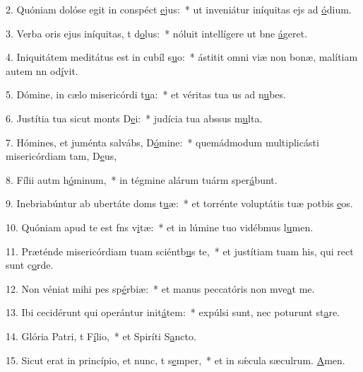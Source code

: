 2. Quóniam dolóse egit in conspéct \uline{e}jus:~* ut inveniátur iníquitas ejs ad \uline{ó}dium.\par 
3. Verba oris ejus iníquitas, t d\uline{o}lus:~* nóluit intellígere ut bne \uline{á}geret.\par 
4. Iniquitátem meditátus est in cubíl s\uline{u}o:~* ástitit omni viæ non bonæ, malítiam autem nn od\uline{í}vit.\par 
5. Dómine, in cælo misericórdi t\uline{u}a:~* et véritas tua us ad n\uline{u}bes.\par 
6. Justítia tua sicut monts D\uline{e}i:~* judícia tua abssus m\uline{u}lta.\par 
7. Hómines, et juménta salvábs, D\uline{ó}mine:~* quemádmodum multiplicásti misericórdiam tam, D\uline{e}us,\par 
8. Fílii autm h\uline{ó}minum,~* in tégmine alárum tuárm sper\uline{á}bunt.\par 
9. Inebriabúntur ab ubertáte doms t\uline{u}æ:~* et torrénte voluptátis tuæ potbis \uline{e}os.\par 
10. Quóniam apud te est fns v\uline{i}tæ:~* et in lúmine tuo vidébmus l\uline{u}men.\par 
11. Præténde misericórdiam tuam sciéntb\uline{u}s te,~* et justítiam tuam his, qui rect sunt c\uline{o}rde.\par 
12. Non véniat mihi pes sp\uline{é}rbiæ:~* et manus peccatóris non mve\uline{a}t me.\par 
13. Ibi cecidérunt qui operántur init\uline{á}tem:~* expúlsi sunt, nec poturunt st\uline{a}re.\par 
14. Glória Patri, t F\uline{í}lio,~* et Spiríti S\uline{a}ncto.\par 
15. Sicut erat in princípio, et nunc, t s\uline{e}mper,~* et in sǽcula sæculrum. \uline{A}men.\par 
